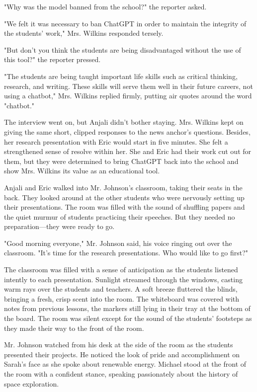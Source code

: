 \documentclass[stu]{apa7}
\begin{document}
"Why was the model banned from the school?" the reporter asked.

"We felt it was necessary to ban ChatGPT in order to maintain the integrity of the students' work," Mrs. Wilkins responded tersely.

"But don't you think the students are being disadvantaged without the use of this tool?" the reporter pressed.

"The students are being taught important life skills such as critical thinking, research, and writing. These skills will serve them well in their future careers, not using a chatbot," Mrs. Wilkins replied firmly, putting air quotes around the word "chatbot."

The interview went on, but Anjali didn't bother staying. Mrs. Wilkins kept on giving the same short, clipped responses to the news anchor's questions. Besides, her research presentation with Eric would start in five minutes. She felt a strengthened sense of resolve within her. She and Eric had their work cut out for them, but they were determined to bring ChatGPT back into the school and show Mrs. Wilkins its value as an educational tool.

Anjali and Eric walked into Mr. Johnson's classroom, taking their seats in the back. They looked around at the other students who were nervously setting up their presentations. The room was filled with the sound of shuffling papers and the quiet murmur of students practicing their speeches. But they needed no preparation---they were ready to go.

"Good morning everyone," Mr. Johnson said, his voice ringing out over the classroom. "It's time for the research presentations. Who would like to go first?"

The classroom was filled with a sense of anticipation as the students listened intently to each presentation. Sunlight streamed through the windows, casting warm rays over the students and teachers. A soft breeze fluttered the blinds, bringing a fresh, crisp scent into the room. The whiteboard was covered with notes from previous lessons, the markers still lying in their tray at the bottom of the board. The room was silent except for the sound of the students' footsteps as they made their way to the front of the room.

Mr. Johnson watched from his desk at the side of the room as the students presented their projects. He noticed the look of pride and accomplishment on Sarah's face as she spoke about renewable energy. Michael stood at the front of the room with a confident stance, speaking passionately about the history of space exploration. 
\end{document}
